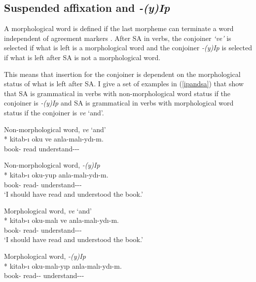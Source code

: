 \subsection{Suspended affixation and \textit{-(y)Ip}} \label{sec:SAandyip}

A morphological word is defined if the last morpheme can terminate a word independent of agreement markers \citep{kabak2007turkish}. After SA in verbs, the conjoiner \textit{`ve'} is selected if what is left is a morphological word and the conjoiner \textit{-(y)Ip} is selected if what is left after SA is not a morphological word. 

This means that insertion for the conjoiner is dependent on the morphological status of what is left after SA. I give a set of examples in (\ref{ipandsa}) that show that SA is grammatical in verbs with non-morphological word status if the conjoiner is \textit{-(y)Ip} and SA is grammatical in verbs with morphological word status if the conjoiner is \textit{ve} `and'.

\begin{exe}
\ex \label{ipandsa}
\begin{xlist}
\ex \begin{xlisti}
\ex Non-morphological word, \textit{ve} `and'\\*
\gll *kitab-ı oku ve anla-malı-ydı-m. \\ 
book-{\Acc} read {\And} understand-{\Nec}-{\Pst}-{\Fsg} \\
\glt ${}$

\ex Non-morphological word, \textit{-(y)Ip}\\*
\gll kitab-ı oku-yup anla-malı-ydı-m. \\ 
book-{\Acc} read-{\Pc} understand-{\Nec}-{\Pst}-{\Fsg} \\
\glt `I should have read and understood the book.'
\end{xlisti}

\ex \begin{xlisti}
\ex Morphological word, \textit{ve} `and'\\* 
\gll kitab-ı oku-malı ve anla-malı-ydı-m. \\ 
book-{\Acc} read-{\Nec} {\And} understand-{\Nec}-{\Pst}-{\Fsg} \\
\glt `I should have read and understood the book.'

\ex Morphological word, \textit{-(y)Ip}\\*
\gll *kitab-ı oku-malı-yıp anla-malı-ydı-m. \\ 
book-{\Acc} read-{\Nec}-{\Pc} understand-{\Nec}-{\Pst}-{\Fsg} \\
\glt ${}$
\end{xlisti}
\end{xlist}
\end{exe}

